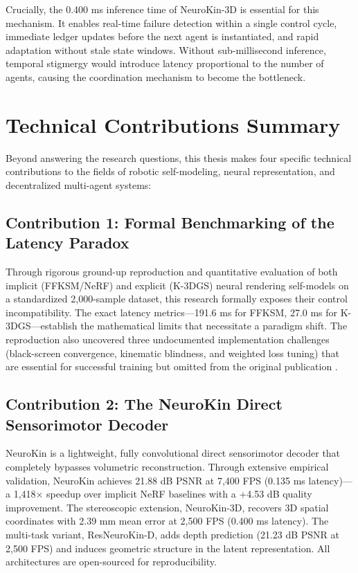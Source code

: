 \documentclass[12pt,a4paper,oneside]{report}
\begin{document}
Crucially, the 0.400 ms inference time of NeuroKin-3D is essential for this mechanism. It enables real-time failure detection within a single control cycle, immediate ledger updates before the next agent is instantiated, and rapid adaptation without stale state windows. Without sub-millisecond inference, temporal stigmergy would introduce latency proportional to the number of agents, causing the coordination mechanism to become the bottleneck.

\section{Technical Contributions Summary}

Beyond answering the research questions, this thesis makes four specific technical contributions to the fields of robotic self-modeling, neural representation, and decentralized multi-agent systems:

\subsection{Contribution 1: Formal Benchmarking of the Latency Paradox}

Through rigorous ground-up reproduction and quantitative evaluation of both implicit (FFKSM/NeRF) and explicit (K-3DGS) neural rendering self-models on a standardized 2,000-sample dataset, this research formally exposes their control incompatibility. The exact latency metrics—191.6 ms for FFKSM, 27.0 ms for K-3DGS—establish the mathematical limits that necessitate a paradigm shift. The reproduction also uncovered three undocumented implementation challenges (black-screen convergence, kinematic blindness, and weighted loss tuning) that are essential for successful training but omitted from the original publication \cite{hu2024teaching}.

\subsection{Contribution 2: The NeuroKin Direct Sensorimotor Decoder}

NeuroKin is a lightweight, fully convolutional direct sensorimotor decoder that completely bypasses volumetric reconstruction. Through extensive empirical validation, NeuroKin achieves 21.88 dB PSNR at 7,400 FPS (0.135 ms latency)—a 1,418× speedup over implicit NeRF baselines with a +4.53 dB quality improvement. The stereoscopic extension, NeuroKin-3D, recovers 3D spatial coordinates with 2.39 mm mean error at 2,500 FPS (0.400 ms latency). The multi-task variant, ResNeuroKin-D, adds depth prediction (21.23 dB PSNR at 2,500 FPS) and induces geometric structure in the latent representation. All architectures are open-sourced for reproducibility.
\end{document}
